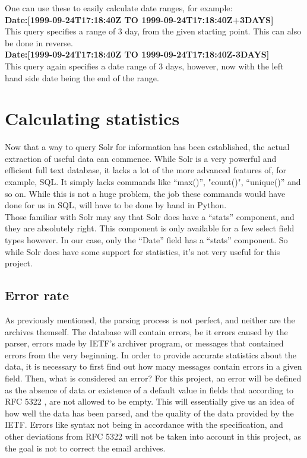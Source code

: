 \documentclass[a4paper,english]{report}
\begin{document}
One can use these to easily calculate date ranges, for example: \\
	


\textbf{Date:[1999-09-24T17:18:40Z TO 1999-09-24T17:18:40Z+3DAYS]}\\ 


This query specifies a range of 3 day, from the given starting point. This can also be done in reverse.\\

\textbf{Date:[1999-09-24T17:18:40Z TO 1999-09-24T17:18:40Z-3DAYS]}\\

This query again specifies a date range of 3 days, however, now with the left hand side date being the end of the range.

\chapter{Calculating statistics}
Now that a way to query Solr for information has been established, the actual extraction of useful data can commence. While Solr is a very powerful and efficient full text database, it lacks a lot of the more advanced features of, for example, SQL. It simply lacks commands like “max()”, "count()", “unique()” and so on. While this is not a huge problem, the job these commands would have done for us in SQL, will have to be done by hand in Python.\\ 
Those familiar with Solr may say that Solr does have a “stats” component, and they are absolutely right. This component is only available for a few select field types however. In our case, only the “Date” field has a “stats” component. So while Solr does have some support for statistics, it's not very useful for this project.

\section{Error rate}

As previously mentioned, the parsing process is not perfect, and neither are the archives themself. The database will contain errors, be it errors caused by the parser, errors made by IETF's archiver program, or messages that contained errors from the very beginning.
In order to provide accurate statistics about the data, it is necessary to first find out how many messages contain errors in a given field. 
Then, what is considered an error?
For this project, an error will be defined as the absence of data or existence of a default value in fields that according to RFC 5322 \cite{RFC5322}, are not allowed to be empty. 
This will essentially give us an idea of how well the data has been parsed, and the quality of the data provided by the IETF.
Errors like syntax not being in accordance with the specification, and other deviations from RFC 5322 \cite{RFC5322} will not be taken into account in this project, as the goal is not to correct the email archives.\\
\end{document}
